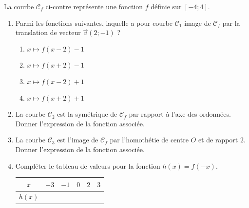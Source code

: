 \documentclass[11pt]{article}
\begin{document}
\begin{exercice}
La courbe $\mathcal{C}_f$ ci-contre représente une fonction $f$ définie sur $[-4; 4]$.
\begin{center}
\end{center}
\begin{enumerate}
    \item Parmi les fonctions suivantes, laquelle a pour courbe $\mathcal{C}_1$ image de $\mathcal{C}_f$ par la translation de vecteur $\vec{v}(2; -1)$ ?
    \begin{enumerate}
        \item $x \mapsto f(x-2)-1$
        \item $x \mapsto f(x+2)-1$
        \item $x \mapsto f(x-2)+1$
        \item $x \mapsto f(x+2)+1$
    \end{enumerate}
    \item La courbe $\mathcal{C}_2$ est la symétrique de $\mathcal{C}_f$ par rapport à l'axe des ordonnées. Donner l'expression de la fonction associée.
    \item La courbe $\mathcal{C}_3$ est l'image de $\mathcal{C}_f$ par l'homothétie de centre $O$ et de rapport $2$. Donner l'expression de la fonction associée.
    \item Compléter le tableau de valeurs pour la fonction $h(x)=f(-x)$.
    \begin{center}
    \begin{tabular}{|c|c|c|c|c|c|}
    \hline
    $x$ & $-3$ & $-1$ & $0$ & $2$ & $3$ \\
    \hline
    $h(x)$ &  &  &  &  &  \\
    \hline
    \end{tabular}
    \end{center}
\end{enumerate}
\end{exercice}
\end{document}
